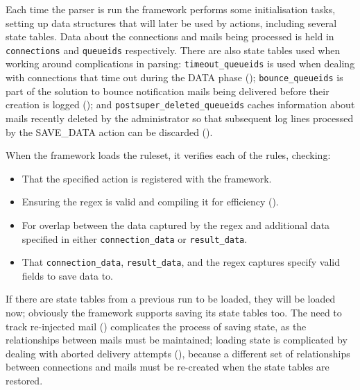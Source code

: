 Each time the parser is run the framework performs some initialisation
tasks, setting up data structures that will later be used by actions,
including several state tables.  Data about the connections and mails being
processed is held in \texttt{connections} and \texttt{queueids}
respectively.  There are also state tables used when working around
complications in parsing: \texttt{timeout\_queueids} is used when dealing
with connections that time out during the DATA phase (); \texttt{bounce\_queueids} is part of the solution to
bounce notification mails being delivered before their creation is logged
(); and \texttt{postsuper\_deleted\_queueids} caches information
about mails recently deleted by the administrator so that subsequent log
lines processed by the SAVE\_DATA action can be discarded ().

When the framework loads the ruleset, it verifies each of the rules,
checking:

\begin{itemize}

    \squeezeitems{}

    \item That the specified action is registered with the framework.

    \item Ensuring the regex is valid and compiling it for efficiency
        ().

    \item For overlap between the data captured by the regex and additional
        data specified in either \texttt{connection\_data} or
        \texttt{result\_data}.

    \item That \texttt{connection\_data}, \texttt{result\_data}, and the
        regex captures specify valid fields to save data to.

\end{itemize}

If there are state tables from a previous \parsername{} run to be loaded,
they will be loaded now; obviously the framework supports saving its state
tables too.  The need to track re-injected mail () complicates the process of saving state, as the relationships
between mails must be maintained; loading state is complicated by dealing
with aborted delivery attempts (),
because a different set of relationships between connections and mails must
be re-created when the state tables are restored.

